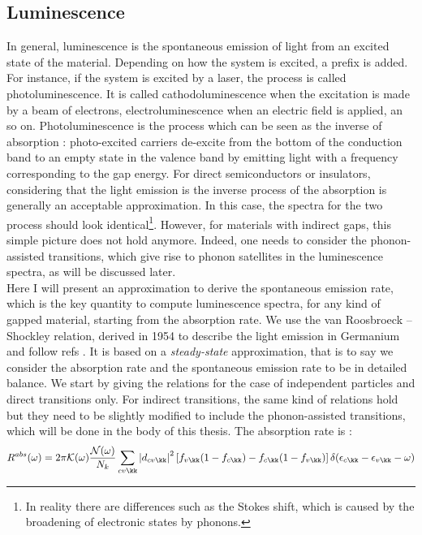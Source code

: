 \subsection{Luminescence}
In general, luminescence is the spontaneous emission of light from an excited state of the material. Depending on how the system is excited, a prefix is added. For instance, if the system is excited by a laser, the process is called photoluminescence. It is called cathodoluminescence when the excitation is made by a beam of electrons, electroluminescence when an electric field is applied, an so on.
Photoluminescence is the process which can be seen as the inverse of absorption : photo-excited carriers de-excite from the bottom of the conduction band to an empty state in the valence band by emitting light with a frequency corresponding to the gap energy. For direct semiconductors or insulators, considering that the light emission is the inverse process of the absorption is generally an acceptable approximation. In this case, the spectra for the two process should look identical\footnote[1]{In reality there are differences such as the Stokes shift, which is caused by the broadening of electronic states by phonons.}. However, for materials with indirect gaps, this simple picture does not hold anymore. Indeed, one needs to consider the phonon-assisted transitions, which give rise to phonon satellites in the luminescence spectra, as will be discussed later. \\
Here I will present an approximation to derive the spontaneous emission rate, which is the key quantity to compute luminescence spectra, for any kind of gapped material, starting from the absorption rate. We use the van Roosbroeck -- Shockley relation, derived in 1954 to describe the light emission in Germanium \cite{van1954photon} and follow refs \cite{paleari2019exciton,paleari2019first,}. It is based on a \emph{steady-state} approximation, that is to say we consider the absorption rate and the spontaneous emission rate to be in detailed balance. We start by giving the relations for the case of independent particles and direct transitions only. For indirect transitions, the same kind of relations hold but they need to be slightly modified to include the phonon-assisted transitions, which will be done in the body of this thesis. The absorption rate is :
\begin{equation}
	R^{abs}(\omega) = 2\pi \mathcal{K}(\omega) \frac{\mathcal{N} (\omega)}{N_k} \sum_{cv\kk} \left|d_{cv\kk} \right|^2 \left[ f_{v\kk}(1-f_{c\kk}) - f_{c\kk}(1-f_{v\kk})\right] \delta(\epsilon_{c\kk} - \epsilon_{v\kk} - \omega)
\end{equation}
